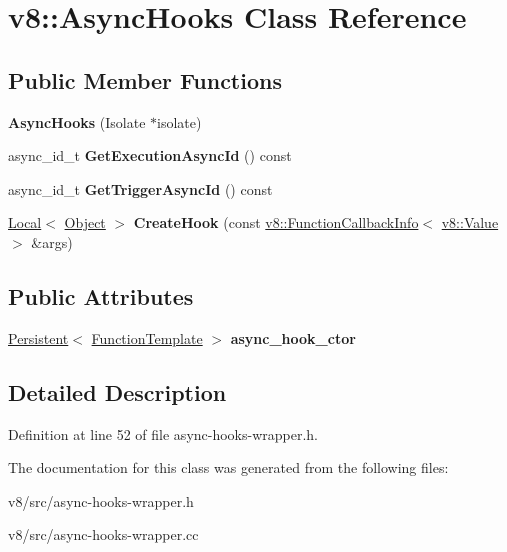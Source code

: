 \hypertarget{classv8_1_1AsyncHooks}{}\section{v8\+:\+:Async\+Hooks Class Reference}
\label{classv8_1_1AsyncHooks}
\subsection*{Public Member Functions}
\begin{DoxyCompactItemize}
\item 
\mbox{\label{classv8_1_1AsyncHooks_abbd3562c0d8cb176e0de48201b390374}} 
{\bfseries Async\+Hooks} (Isolate $\ast$isolate)
\item 
\mbox{\label{classv8_1_1AsyncHooks_ad0e6836aaf8f85b0a6066622ab4c0bf2}} 
async\+\_\+id\+\_\+t {\bfseries Get\+Execution\+Async\+Id} () const
\item 
\mbox{\label{classv8_1_1AsyncHooks_aa127cae84831c8f8c8bd296e2ea09c2a}} 
async\+\_\+id\+\_\+t {\bfseries Get\+Trigger\+Async\+Id} () const
\item 
\mbox{\label{classv8_1_1AsyncHooks_a5b24ba8bd1c3c9efc6e541128a791c11}} 
\mbox{\hyperlink{classv8_1_1Local}{Local}}$<$ \mbox{\hyperlink{classv8_1_1Object}{Object}} $>$ {\bfseries Create\+Hook} (const \mbox{\hyperlink{classv8_1_1FunctionCallbackInfo}{v8\+::\+Function\+Callback\+Info}}$<$ \mbox{\hyperlink{classv8_1_1Value}{v8\+::\+Value}} $>$ \&args)
\end{DoxyCompactItemize}
\subsection*{Public Attributes}
\begin{DoxyCompactItemize}
\item 
\mbox{\label{classv8_1_1AsyncHooks_a801c22bfdf4da8138d2d5b4ad6af7f4f}} 
\mbox{\hyperlink{classv8_1_1Persistent}{Persistent}}$<$ \mbox{\hyperlink{classv8_1_1FunctionTemplate}{Function\+Template}} $>$ {\bfseries async\+\_\+hook\+\_\+ctor}
\end{DoxyCompactItemize}


\subsection{Detailed Description}


Definition at line 52 of file async-\/hooks-\/wrapper.\+h.



The documentation for this class was generated from the following files\+:\begin{DoxyCompactItemize}
\item 
v8/src/async-\/hooks-\/wrapper.\+h\item 
v8/src/async-\/hooks-\/wrapper.\+cc\end{DoxyCompactItemize}
